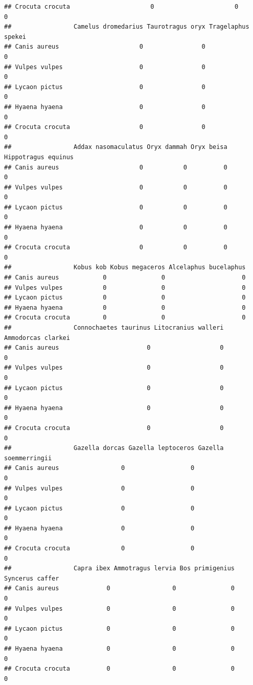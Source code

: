 \documentclass[
]{article}
\begin{document}
\begin{verbatim}
## Crocuta crocuta                      0                      0                 0
##                 Camelus dromedarius Taurotragus oryx Tragelaphus spekei
## Canis aureus                      0                0                  0
## Vulpes vulpes                     0                0                  0
## Lycaon pictus                     0                0                  0
## Hyaena hyaena                     0                0                  0
## Crocuta crocuta                   0                0                  0
##                 Addax nasomaculatus Oryx dammah Oryx beisa Hippotragus equinus
## Canis aureus                      0           0          0                   0
## Vulpes vulpes                     0           0          0                   0
## Lycaon pictus                     0           0          0                   0
## Hyaena hyaena                     0           0          0                   0
## Crocuta crocuta                   0           0          0                   0
##                 Kobus kob Kobus megaceros Alcelaphus bucelaphus
## Canis aureus            0               0                     0
## Vulpes vulpes           0               0                     0
## Lycaon pictus           0               0                     0
## Hyaena hyaena           0               0                     0
## Crocuta crocuta         0               0                     0
##                 Connochaetes taurinus Litocranius walleri Ammodorcas clarkei
## Canis aureus                        0                   0                  0
## Vulpes vulpes                       0                   0                  0
## Lycaon pictus                       0                   0                  0
## Hyaena hyaena                       0                   0                  0
## Crocuta crocuta                     0                   0                  0
##                 Gazella dorcas Gazella leptoceros Gazella soemmerringii
## Canis aureus                 0                  0                     0
## Vulpes vulpes                0                  0                     0
## Lycaon pictus                0                  0                     0
## Hyaena hyaena                0                  0                     0
## Crocuta crocuta              0                  0                     0
##                 Capra ibex Ammotragus lervia Bos primigenius Syncerus caffer
## Canis aureus             0                 0               0               0
## Vulpes vulpes            0                 0               0               0
## Lycaon pictus            0                 0               0               0
## Hyaena hyaena            0                 0               0               0
## Crocuta crocuta          0                 0               0               0
\end{verbatim}
\end{document}
